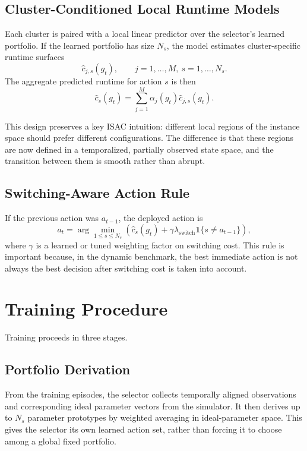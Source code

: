 \documentclass[conference]{IEEEtran}
\begin{document}
\subsection{Cluster-Conditioned Local Runtime Models}

Each cluster is paired with a local linear predictor over the selector's learned portfolio. If the learned portfolio has size $N_s$, the model estimates cluster-specific runtime surfaces
\[
\hat{c}_{j,s}(g_t), \qquad j=1,\dots,M,\ s=1,\dots,N_s.
\]
The aggregate predicted runtime for action $s$ is then
\[
\hat{c}_s(g_t) = \sum_{j=1}^M \alpha_j(g_t)\hat{c}_{j,s}(g_t).
\]

This design preserves a key ISAC intuition: different local regions of the instance space should prefer different configurations. The difference is that these regions are now defined in a temporalized, partially observed state space, and the transition between them is smooth rather than abrupt.

\subsection{Switching-Aware Action Rule}

If the previous action was $a_{t-1}$, the deployed action is
\[
a_t =
\arg\min_{1 \le s \le N_s}
\left(
\hat{c}_s(g_t) + \gamma \lambda_{\mathrm{switch}}\mathbf{1}\{s \neq a_{t-1}\}
\right),
\]
where $\gamma$ is a learned or tuned weighting factor on switching cost. This rule is important because, in the dynamic benchmark, the best immediate action is not always the best decision after switching cost is taken into account.

\section{Training Procedure}

Training proceeds in three stages.

\subsection{Portfolio Derivation}

From the training episodes, the selector collects temporally aligned observations and corresponding ideal parameter vectors from the simulator. It then derives up to $N_s$ parameter prototypes by weighted averaging in ideal-parameter space. This gives the selector its own learned action set, rather than forcing it to choose among a global fixed portfolio.
\end{document}
